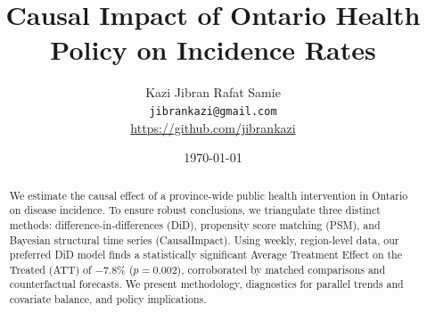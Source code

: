\documentclass[10pt]{article}
\title{\textbf{Causal Impact of Ontario Health Policy on Incidence Rates}}
\author{Kazi Jibran Rafat Samie \\ \texttt{jibrankazi@gmail.com} \\ \url{https://github.com/jibrankazi}}
\date{\today}
\begin{document}
\maketitle

\begin{abstract}
We estimate the causal effect of a province-wide public health intervention in Ontario on disease incidence. To ensure robust conclusions, we triangulate three distinct methods: difference-in-differences (DiD), propensity score matching (PSM), and Bayesian structural time series (CausalImpact). Using weekly, region-level data, our preferred DiD model finds a statistically significant Average Treatment Effect on the Treated (ATT) of \(-7.8\%\) (\(p=0.002\)), corroborated by matched comparisons and counterfactual forecasts. We present methodology, diagnostics for parallel trends and covariate balance, and policy implications.
\end{abstract}
\end{document}
